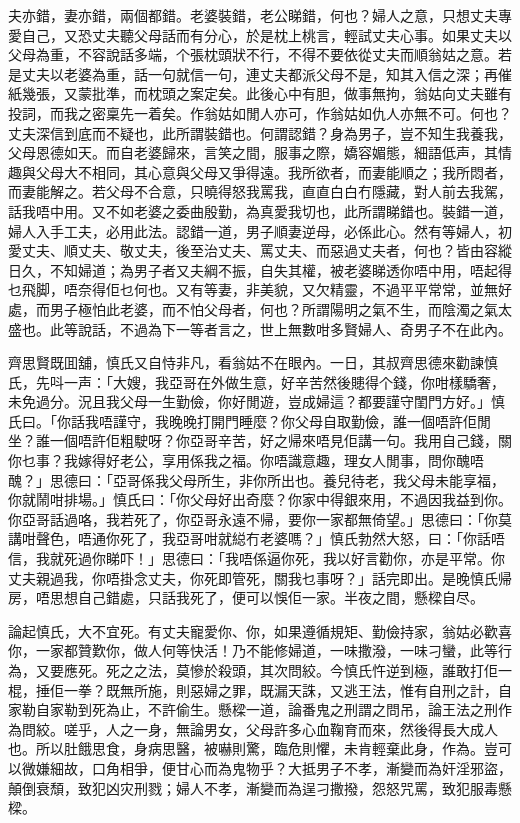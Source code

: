 \documentclass[a5paper, 12pt, openany]{book} %
\begin{document}
	夫亦錯，妻亦錯，兩個都錯。老婆裝錯，老公睇錯，何也？婦人之意，只想丈夫專愛自己，又恐丈夫聽父母話而有分心，於是枕上桃言，輕試丈夫心事。如果丈夫以父母為重，不容說話多端，个張枕頭狀不行，不得不要依從丈夫而順翁姑之意。若是丈夫以老婆為重，話一句就信一句，連丈夫都派父母不是，知其入信之深；再催紙幾張，又蒙批準，而枕頭之案定矣。此後心中有胆，做事無拘，翁姑向丈夫雖有投詞，而我之密稟先一着矣。作翁姑如閒人亦可，作翁姑如仇人亦無不可。何也？丈夫深信到底而不疑也，此所謂裝錯也。何謂認錯？身為男子，豈不知生我養我，父母恩德如天。而自老婆歸來，言笑之間，服事之際，嬌容媚態，細語低声，其情趣與父母大不相同，其心意與父母又爭得遠。我所欲者，而妻能順之；我所悶者，而妻能解之。若父母不合意，只曉得怒我罵我，直直白白冇隱藏，對人前去我駕，話我唔中用。又不如老婆之委曲殷勤，為真愛我切也，此所謂睇錯也。裝錯一道，婦人入手工夫，必用此法。認錯一道，男子順妻逆母，必係此心。然有等婦人，初愛丈夫、順丈夫、敬丈夫，後至治丈夫、罵丈夫、而惡過丈夫者，何也？皆由容縱日久，不知婦道；為男子者又夫綱不振，自失其權，被老婆睇透你唔中用，唔起得乜飛脚，唔奈得佢乜何也。又有等妻，非美貌，又欠精靈，不過平平常常，並無好處，而男子極怕此老婆，而不怕父母者，何也？所謂陽明之氣不生，而陰濁之氣太盛也。此等說話，不過為下一等者言之，世上無數咁多賢婦人、奇男子不在此內。

	齊思賢既囬舖，慎氏又自恃非凡，看翁姑不在眼內。一日，其叔齊思德來勸諫慎氏，先呌一声：「大嫂，我亞哥在外做生意，好辛苦然後贃得个錢，你咁樣驕奢，未免過分。況且我父母一生勤儉，你好閒遊，豈成婦這？都要謹守閨門方好。」慎氏曰。「你話我唔謹守，我晚晚打開門睡麼？你父母自取勤儉，誰一個唔許佢閒坐？誰一個唔許佢粗駛呀？你亞哥辛苦，好之帰來唔見佢講一句。我用自己錢，關你乜事？我嫁得好老公，享用係我之福。你唔識意趣，理女人閒事，問你醜唔醜？」思德曰：「亞哥係我父母所生，非你所出也。養兒待老，我父母未能享福，你就鬧咁排場。」慎氏曰：「你父母好出奇麼？你家中得銀來用，不過因我益到你。你亞哥話過咯，我若死了，你亞哥永遠不帰，要你一家都無倚望。」思德曰：「你莫講咁聲色，唔通你死了，我亞哥咁就縂冇老婆嗎？」慎氏勃然大怒，曰：「你話唔信，我就死過你睇吓！」思德曰：「我唔係逼你死，我以好言勸你，亦是平常。你丈夫親過我，你唔掛念丈夫，你死即管死，關我乜事呀？」話完即出。是晚慎氏帰房，唔思想自己錯處，只話我死了，便可以悞佢一家。半夜之間，懸樑自尽。

	論起慎氏，大不宜死。有丈夫寵愛你、你，如果遵循規矩、勤儉持家，翁姑必歡喜你，一家都贊歎你，做人何等快活！乃不能修婦道，一味撒潑，一味刁蠻，此等行為，又要應死。死之之法，莫慘於殺頭，其次問絞。今慎氏忤逆到極，誰敢打佢一棍，捶佢一拳？既無所施，則惡婦之罪，既漏天誅，又逃王法，惟有自刑之計，自家勒自家勒到死為止，不許偷生。懸樑一道，論番鬼之刑謂之問吊，論王法之刑作為問絞。嗟乎，人之一身，無論男女，父母許多心血鞠育而來，然後得長大成人也。所以肚餓思食，身病思醫，被嚇則驚，臨危則懼，未肯輕棄此身，作為。豈可以微嫌細故，口角相爭，便甘心而為鬼物乎？大抵男子不孝，漸變而為奸淫邪盜，顛倒衰頹，致犯凶灾刑戮；婦人不孝，漸變而為逞刁撒撥，怨怒咒罵，致犯服毒懸樑。
\end{document}
